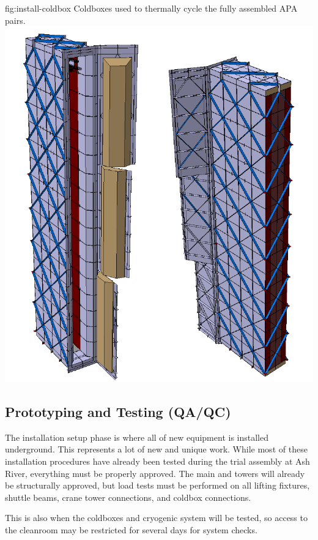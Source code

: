 \begin{dunefigure}{fig:install-coldbox}
  {Coldboxes used to thermally cycle the fully assembled APA pairs. }
\includegraphics[width=.5\textwidth]{graphics/install-coldbox.pdf}
\end{dunefigure}



\clearpage

\subsection{Prototyping and Testing (QA/QC)}
\label{sec:fdsp-tc-infr-qaqc}
The installation setup phase is where all of new equipment is installed underground. This represents a lot of new and unique work. While most of these installation procedures have already been tested during the trial assembly at Ash River, everything must be properly approved. The main  and  towers will already be structurally approved, but load tests must be performed on all lifting fixtures, shuttle beams, crane tower connections, and coldbox connections. 

This is also when the coldboxes and cryogenic system will be tested, so access to the cleanroom  may be restricted for several days for system checks.


